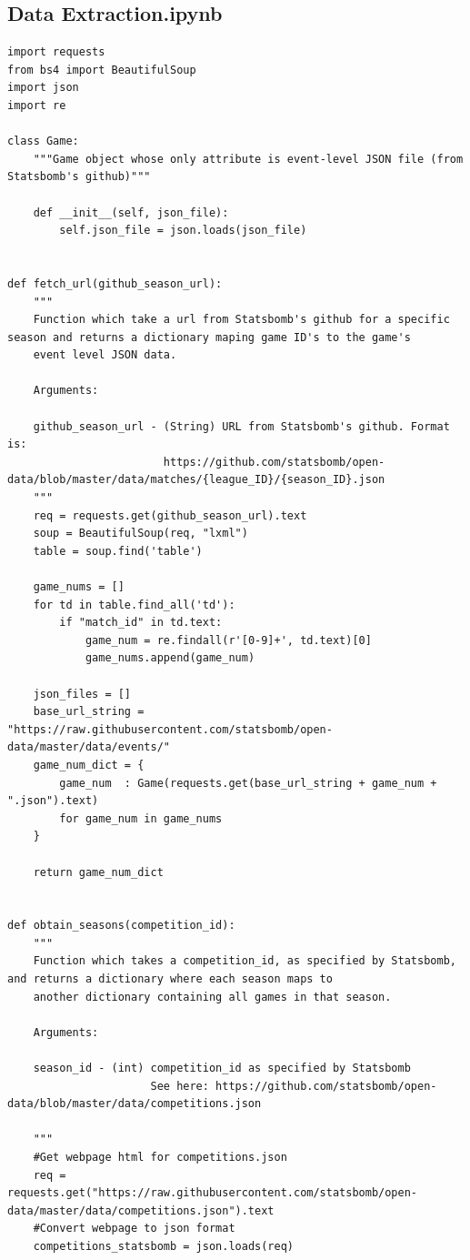 \subsection{Data Extraction.ipynb}
\begin{lstlisting}[style=Python]
import requests
from bs4 import BeautifulSoup
import json
import re

class Game:
    """Game object whose only attribute is event-level JSON file (from Statsbomb's github)"""
    
    def __init__(self, json_file):
        self.json_file = json.loads(json_file)


def fetch_url(github_season_url):
    """
    Function which take a url from Statsbomb's github for a specific season and returns a dictionary maping game ID's to the game's 
    event level JSON data.
    
    Arguments:
    
    github_season_url - (String) URL from Statsbomb's github. Format is:
                        https://github.com/statsbomb/open-data/blob/master/data/matches/{league_ID}/{season_ID}.json
    """
    req = requests.get(github_season_url).text
    soup = BeautifulSoup(req, "lxml") 
    table = soup.find('table')
    
    game_nums = []
    for td in table.find_all('td'):
        if "match_id" in td.text:
            game_num = re.findall(r'[0-9]+', td.text)[0]
            game_nums.append(game_num)
            
    json_files = []
    base_url_string = "https://raw.githubusercontent.com/statsbomb/open-data/master/data/events/"
    game_num_dict = {
        game_num  : Game(requests.get(base_url_string + game_num + ".json").text)
        for game_num in game_nums
    }
 
    return game_num_dict


def obtain_seasons(competition_id):
    """
    Function which takes a competition_id, as specified by Statsbomb, and returns a dictionary where each season maps to 
    another dictionary containing all games in that season.
    
    Arguments:
    
    season_id - (int) competition_id as specified by Statsbomb 
                      See here: https://github.com/statsbomb/open-data/blob/master/data/competitions.json
    
    """
    #Get webpage html for competitions.json
    req = requests.get("https://raw.githubusercontent.com/statsbomb/open-data/master/data/competitions.json").text
    #Convert webpage to json format
    competitions_statsbomb = json.loads(req)


\end{lstlisting}
